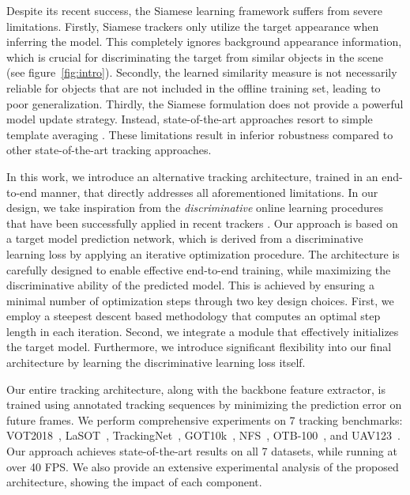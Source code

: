 \documentclass[10pt,twocolumn,letterpaper]{article}
\begin{document}
Despite its recent success, the Siamese learning framework suffers from severe limitations. Firstly, Siamese trackers only utilize the target appearance when inferring the model. This completely ignores background appearance information, which is crucial for discriminating the target from similar objects in the scene (see figure~\ref{fig:intro}). Secondly, the learned similarity measure is not necessarily reliable for objects that are not included in the offline training set, leading to poor generalization. Thirdly, the Siamese formulation does not provide a powerful model update strategy. Instead, state-of-the-art approaches resort to simple template averaging \cite{DaSiamRPN}. These limitations result in inferior robustness \cite{VOT2018} compared to other state-of-the-art tracking approaches. 

In this work, we introduce an alternative tracking architecture, trained in an end-to-end manner, that directly addresses all aforementioned limitations. In our design, we take inspiration from the \emph{discriminative} online learning procedures that have been successfully applied in recent trackers \cite{ATOM,DanelljanECCV2016,MDNet}. Our approach is based on a target model prediction network, which is derived from a discriminative learning loss by applying an iterative optimization procedure. The architecture is carefully designed to enable effective end-to-end training, while maximizing the discriminative ability of the predicted model. This is achieved by ensuring a minimal number of optimization steps through two key design choices. First, we employ a steepest descent based methodology that computes an optimal step length in each iteration. Second, we integrate a module that effectively initializes the target model. Furthermore, we introduce significant flexibility into our final architecture by learning the discriminative learning loss itself. 


Our entire tracking architecture, along with the backbone feature extractor, is trained using annotated tracking sequences by minimizing the prediction error on future frames. We perform comprehensive experiments on 7 tracking benchmarks: VOT2018~\cite{VOT2018}, LaSOT~\cite{LaSOT}, TrackingNet~\cite{TrackingNet}, GOT10k~\cite{GOT10k}, NFS~\cite{NfS}, OTB-100~\cite{OTB2015}, and UAV123~\cite{UAV123}. Our approach achieves state-of-the-art results on all 7 datasets, while running at over 40 FPS. We also provide an extensive experimental analysis of the proposed architecture, showing the impact of each component.
\end{document}
